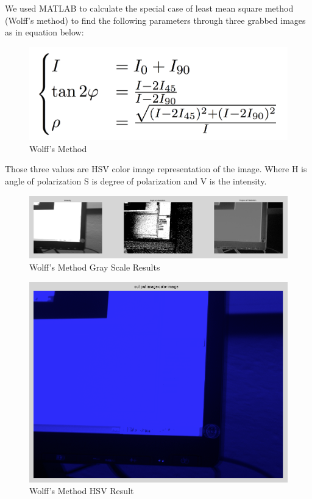\documentclass{article}
\begin{document}
	We used MATLAB to calculate the special case of least mean square method (Wolff's method) to find the following parameters through three grabbed images as in equation below:
	\begin{figure}[H]
	\centering
	\includegraphics[scale=0.1]{WolffMethod.png}
	\caption{Wolff's Method}
	\end{figure}
	
	Those three values are HSV color image representation of the image. Where H is angle of polarization S is degree of polarization and V is the intensity.
	\begin{figure}[H]
	\centering
	\includegraphics[scale=0.30]{PolaFirstPartImage2.png}
	\caption{Wolff's Method Gray Scale Results}
	\end{figure}
	
	\begin{figure}[H]
	\centering
	\includegraphics[scale=0.2]{PolaFirstPartImage3.png}
	\caption{Wolff's Method HSV Result}
	\end{figure}
	
\end{document}
